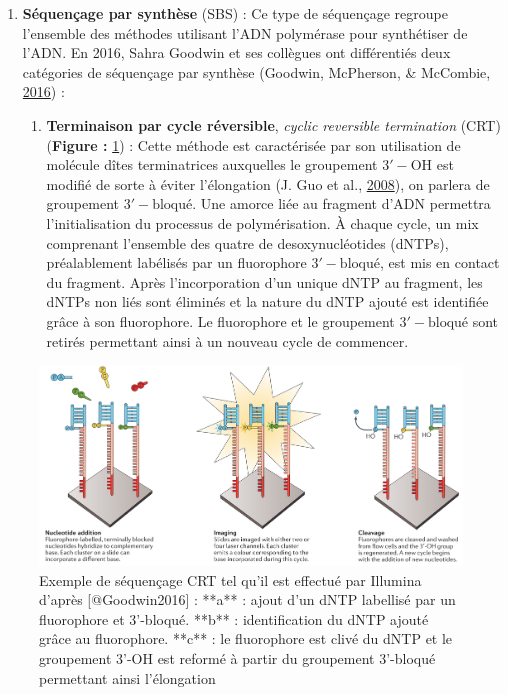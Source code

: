 \documentclass[12pt,twoside]{reedthesis}
\providecommand{\tightlist}{%
  \setlength{\itemsep}{0pt}\setlength{\parskip}{0pt}}
\theoremstyle{definition}
\theoremstyle{definition}
\theoremstyle{remark}
\begin{document}
  \begin{enumerate}
  \def\labelenumi{\arabic{enumi}.}
  \tightlist
  \item
    \textbf{Séquençage par synthèse} (SBS) : Ce type de séquençage
    regroupe l'ensemble des méthodes utilisant l'ADN polymérase pour
    synthétiser de l'ADN. En 2016, Sahra Goodwin et ses collègues ont
    différentiés deux catégories de séquençage par synthèse (Goodwin,
    McPherson, \& McCombie, \protect\hyperlink{ref-Goodwin2016}{2016}) :
  
    \begin{enumerate}
    \def\labelenumii{\alph{enumii}.}
    \tightlist
    \item
      \textbf{Terminaison par cycle réversible}, \emph{cyclic reversible
      termination} (CRT) (\textbf{Figure : }\ref{fig:crtSeq}) : Cette
      méthode est caractérisée par son utilisation de molécule dîtes
      terminatrices auxquelles le groupement \(\mathrm{3'-OH}\) est
      modifié de sorte à éviter l'élongation (J. Guo et al.,
      \protect\hyperlink{ref-Guo2008}{2008}), on parlera de groupement
      \(\mathrm{3'-bloqué}\). Une amorce liée au fragment d'ADN permettra
      l'initialisation du processus de polymérisation. À chaque cycle, un
      mix comprenant l'ensemble des quatre de desoxynucléotides (dNTPs),
      préalablement labélisés par un fluorophore \(\mathrm{3'-bloqué}\),
      est mis en contact du fragment. Après l'incorporation d'un unique
      dNTP au fragment, les dNTPs non liés sont éliminés et la nature du
      dNTP ajouté est identifiée grâce à son fluorophore. Le fluorophore
      et le groupement \(\mathrm{3'-bloqué}\) sont retirés permettant
      ainsi à un nouveau cycle de commencer.
    \end{enumerate}
  \end{enumerate}
  
  \begin{figure}
  
  {\centering \includegraphics[scale=.28]{figure/CRT_seq_illumina} 
  
  }
  
  \caption[Exemple de séquençage CRT tel qu'il est effectué par Illumina]{Exemple de séquençage CRT tel qu'il est effectué par Illumina d'après [@Goodwin2016] : **a** : ajout d'un dNTP labellisé par un fluorophore et 3'-bloqué. **b** : identification du dNTP ajouté grâce au fluorophore. **c** : le fluorophore est clivé du dNTP et le groupement 3'-OH est reformé à partir du groupement 3'-bloqué permettant ainsi l'élongation}\label{fig:crtSeq}
  \end{figure}
  
\end{document}
